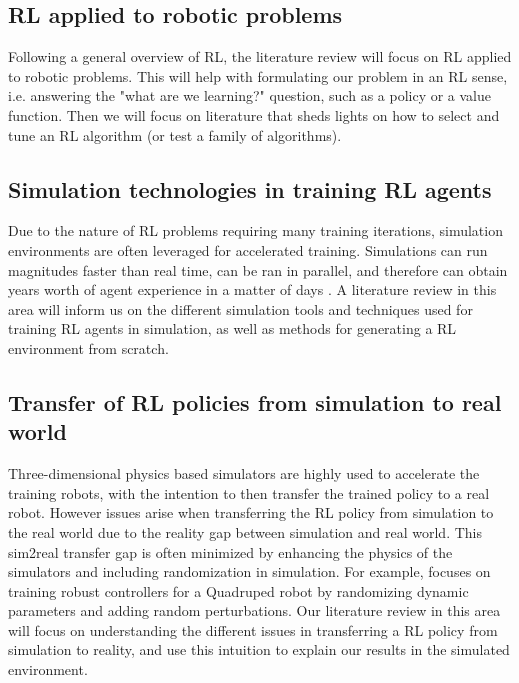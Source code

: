 \documentclass{article}
\begin{document}
\subsection{RL applied to robotic problems}
Following a general overview of RL, the literature review will focus on RL applied to robotic problems. This will help with formulating our problem in an RL sense, i.e. answering the "what are we learning?" question, such as a policy or a value function. Then we will focus on literature that sheds lights on how to select and tune an RL algorithm (or test a family of algorithms).

\subsection{Simulation technologies in training RL agents}
Due to the nature of RL problems requiring many training iterations, simulation environments are often leveraged for accelerated training. Simulations can run magnitudes faster than real time, can be ran in parallel, and therefore can obtain years worth of agent experience in a matter of days \cite{kadian2019we}. A literature review in this area will inform us on the different simulation tools and techniques used for training RL agents in simulation, as well as methods for generating a RL environment from scratch. 

\subsection{Transfer of RL policies from simulation to real world}
Three-dimensional physics based simulators are highly used to accelerate the training robots, with the intention to then transfer the trained policy to a real robot. However issues arise when transferring the RL policy from simulation to the real world due to the reality gap between simulation and real world. This sim2real transfer gap is often minimized by enhancing the physics of the simulators and including randomization in simulation. For example,  \cite{tan2018sim} focuses on training robust controllers for a Quadruped robot by randomizing dynamic parameters and adding random perturbations. Our literature review in this area will focus on understanding the different issues in transferring a RL policy from simulation to reality, and use this intuition to explain our results in the simulated environment.  




\end{document}
